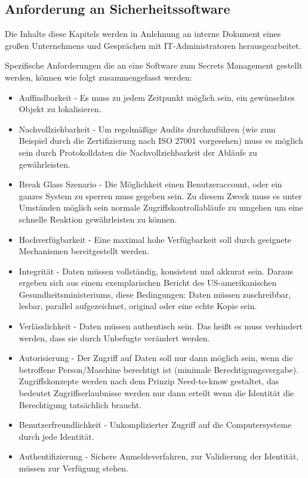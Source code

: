 \documentclass[
book,
a4paper,   
titlepage,  
halfparskip,
12pt        
]{scrartcl}
\begin{document}
\begin{onehalfspacing}
\subsection{Anforderung an Sicherheitssoftware}
\label{subsubsec:anforderung}
Die Inhalte diese Kapitels werden in Anlehnung an interne Dokument eines großen Unternehmens und Gesprächen mit \ac{IT}-Administratoren herausgearbeitet.

Spezifische Anforderungen die an eine Software zum Secrets Management gestellt werden, können wie folgt zusammengefasst werden:

\begin{itemize}
  \item Auffindbarkeit - Es muss zu jedem Zeitpunkt möglich sein, ein gewünschtes Objekt zu lokalisieren.\cite[S. 3]{kerberos2}
  \item Nachvollziehbarkeit - Um regelmäßige Audits durchzuführen (wie zum Beispiel durch die Zertifizierung nach ISO 27001 vorgesehen\cite[S. 17]{risiko}) muss es möglich sein durch Protokolldaten die Nachvollziehbarkeit der Abläufe zu gewährleisten.
  \item Break Glass Szenario - Die Möglichkeit einen Benutzeraccount, oder ein ganzes System zu sperren muss gegeben sein. Zu diesem Zweck muss es unter Umständen möglich sein normale Zugriffskontrollabläufe zu umgehen um eine schnelle Reaktion gewährleisten zu können.\cite{break}
  \item Hochverfügbarkeit - Eine maximal hohe Verfügbarkeit soll durch geeignete Mechanismen bereitgestellt werden.\cite[S. 3]{ha} 
  \item Integrität - Daten müssen vollständig, konsistent und akkurat sein. Daraus ergeben sich aus einem exemplarischen Bericht des US-amerikanischen Gesundheitsministeriums, diese Bedingungen: Daten müssen zuschreibbar, lesbar, parallel aufgezeichnet, original oder eine echte Kopie sein.\cite[S. 2]{health}
  \item Verlässlichkeit - Daten müssen authentisch sein. Das heißt es muss verhindert werden, dass sie durch Unbefugte verändert werden.
  \item Autorisierung - Der Zugriff auf Daten soll nur dann möglich sein, wenn die betroffene Person/Maschine berechtigt ist (minimale Berechtigungsvergabe). Zugriffskonzepte werden nach dem Prinzip Need-to-know gestaltet, das bedeutet Zugriffserlaubnisse werden nur dann erteilt wenn die Identität die Berechtigung tatsächlich braucht.
  \item Benutzerfreundlichkeit - Unkomplizierter Zugriff auf die Computersysteme durch jede Identität.
  \item Authentifizierung - Sichere Anmeldeverfahren, zur Validierung der Identität,  müssen zur Verfügung stehen.
\end{itemize}


\end{onehalfspacing}
\end{document}
